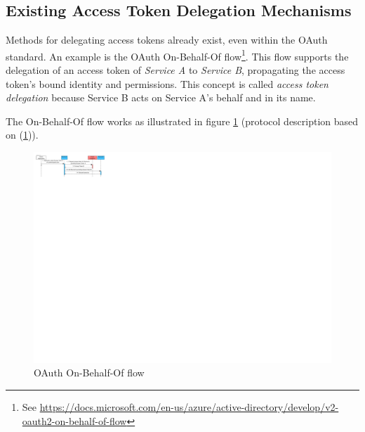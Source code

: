 \subsection{Existing Access Token Delegation Mechanisms}
Methods for delegating access tokens already exist, even within the OAuth standard. An example is the OAuth On-Behalf-Of flow\footnote{\label{fn:obo}See \url{https://docs.microsoft.com/en-us/azure/active-directory/develop/v2-oauth2-on-behalf-of-flow}}. This flow supports the delegation of an access token of \textit{Service A} to \textit{Service B}, propagating the access token's bound identity and permissions. This concept is called \textit{access token delegation} because Service B acts on Service A's behalf and in its name. 

The On-Behalf-Of flow works as illustrated in figure \ref{fig:obo-flow} (protocol description based on (\ref{fn:obo})). 

\begin{figure}[H]
    \centering
   \includegraphics[width=1.0\textwidth]{images/macaroons-solid/InteractionDiagram-OBO-Flow.pdf}
    \caption{OAuth On-Behalf-Of flow}
    \label{fig:obo-flow}
\end{figure}

